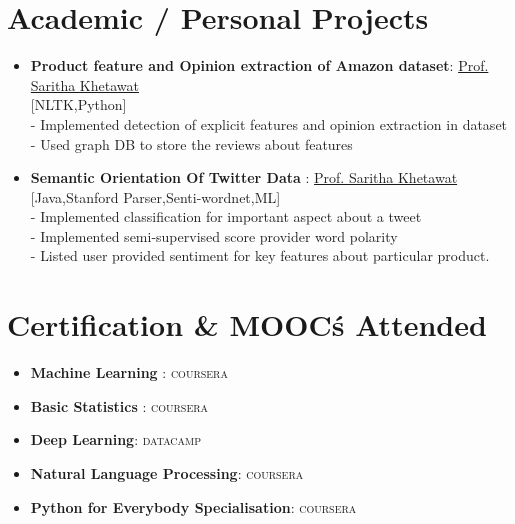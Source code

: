 \documentclass[letterpaper,11pt]{article}
\newcommand{\resumeItem}[2]{
	\item\small{
		\textbf{#1}{: #2 \vspace{-2pt}}
	}
}
\newcommand{\resumeSubItem}[2]{\resumeItem{#1}{#2}\vspace{-4pt}}
\newcommand{\resumeSubHeadingListStart}{\begin{itemize}[leftmargin=*]}
\newcommand{\resumeSubHeadingListEnd}{\end{itemize}}
\begin{document}
	
	\section{Academic / Personal Projects}
	\resumeSubHeadingListStart
	\resumeSubItem{Product feature and Opinion extraction of Amazon dataset}
	\hfill \href{mailto:sarithakishan@gmail.com}{Prof. Saritha Khetawat}\newline\\
	\hfill{[NLTK,Python]}\\
	\quad - {Implemented detection of explicit features and opinion extraction in dataset}\\
	\quad - {Used graph DB to store the reviews about features}\\
	
	\resumeSubItem{Semantic Orientation Of Twitter Data }
	\hfill \href{mailto:sarithakishan@gmail.com}{Prof. Saritha Khetawat}\newline\\
	\hfill{[Java,Stanford Parser,Senti-wordnet,ML]}\\
	\quad - {Implemented classification for important aspect about a tweet}\\
	\quad - {Implemented semi-supervised score provider word polarity}\\
	\quad - {Listed user provided sentiment for key features about particular product.}\\

	\resumeSubHeadingListEnd
	
	
	\section{Certification \& MOOC\' s Attended}
	
	\resumeSubHeadingListStart
	\resumeSubItem{Machine Learning } \hfill\textsc{coursera}
	\resumeSubItem{Basic Statistics } \hfill\textsc{coursera} 
	\resumeSubItem{Deep Learning} \hfill\textsc{datacamp}
	\resumeSubItem{Natural Language Processing}
	\hfill\textsc{coursera}
	\resumeSubItem{Python for Everybody Specialisation} \hfill\textsc{coursera}
	
	\resumeSubHeadingListEnd
	
	
	
\end{document}
